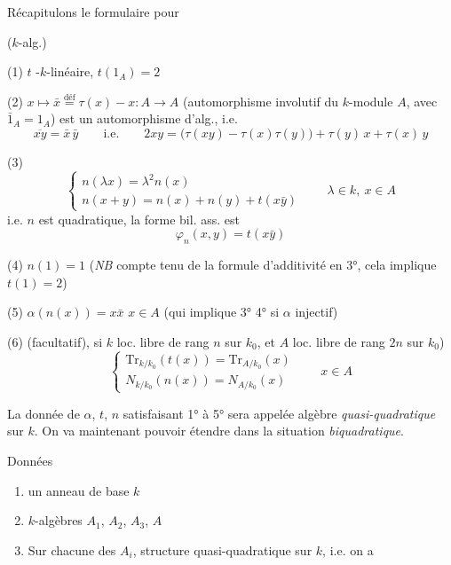 \documentclass[11pt,a4paper]{article}
\begin{document}
Récapitulons le formulaire pour


($k$-alg.)


(1) $t$ -$k$-linéaire, $t(1_A) = 2$

(2) $x \mapsto \bar{x} \overset{\mathrm{déf}}{=} \tau(x) - x : A \to A$ \quad (automorphisme involutif du $k$-module $A$, avec $\bar{1}_A = 1_A$) est un automorphisme d'alg., i.e.
\[
  \overline{xy} = \bar{x}\,\bar{y} \qquad \text{i.e.} \qquad
  2xy = \bigl(\tau(xy) - \tau(x)\tau(y)\bigr) + \tau(y)\,x + \tau(x)\,y
\]

(3)
\[
  \begin{cases}
    n(\lambda x) = \lambda^2 n(x) \\
    n(x + y) = n(x) + n(y) + t(x\bar{y})
  \end{cases}
  \qquad \lambda \in k , \ x \in A
\]
i.e. $n$ est quadratique, la forme bil. ass. est
\[
  \varphi_n(x, y) = t(x \bar{y})
\]

(4) $n(1) = 1$ \quad (\emph{NB} compte tenu de la formule d'additivité en 3°, cela implique $t(1) = 2$)

(5) $\alpha(n(x)) = x \bar{x}$ \quad $x \in A$ \quad (qui implique 3° 4° si $\alpha$ injectif)

(6) (facultatif),  si $k$ loc. libre de rang $n$ sur $k_0$, et $A$ loc. libre de rang $2n$ sur $k_0$)
\[
  \begin{cases}
    \mathrm{Tr}_{k/k_0}(t(x)) = \mathrm{Tr}_{A/k_0}(x) \\
    N_{k/k_0}(n(x)) = N_{A/k_0}(x)
  \end{cases}
  \qquad x \in A
\]

La donnée de  $\alpha$, $t$, $n$ satisfaisant 1° à 5° sera appelée algèbre \emph{quasi-quadratique} sur $k$. On va maintenant pouvoir étendre dans la situation \emph{biquadratique}.

Données
\begin{enumerate}
  \item[a)] un anneau de base $k$
  \item[b)] $k$-algèbres $A_1$, $A_2$, $A_3$, $A$
  \item[c)] Sur chacune des $A_i$, structure quasi-quadratique sur $k$, i.e. on a
\end{enumerate}
\end{document}
